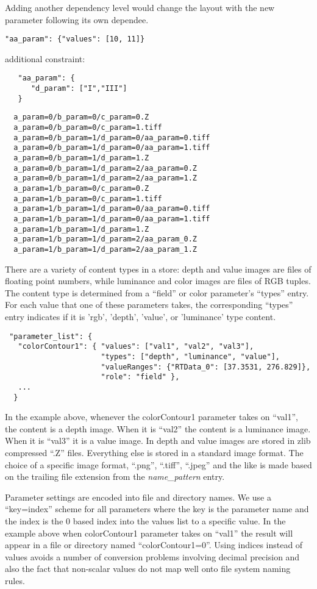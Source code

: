 Adding another dependency level would change the layout with the new parameter following its own dependee.
\begin{verbatim}
"aa_param": {"values": [10, 11]}
\end{verbatim}
additional constraint:
\begin{verbatim}
   "aa_param": {
      "d_param": ["I","III"]
   }
\end{verbatim}
\begin{verbatim}
  a_param=0/b_param=0/c_param=0.Z
  a_param=0/b_param=0/c_param=1.tiff
  a_param=0/b_param=1/d_param=0/aa_param=0.tiff
  a_param=0/b_param=1/d_param=0/aa_param=1.tiff
  a_param=0/b_param=1/d_param=1.Z
  a_param=0/b_param=1/d_param=2/aa_param=0.Z
  a_param=0/b_param=1/d_param=2/aa_param=1.Z
  a_param=1/b_param=0/c_param=0.Z
  a_param=1/b_param=0/c_param=1.tiff
  a_param=1/b_param=1/d_param=0/aa_param=0.tiff
  a_param=1/b_param=1/d_param=0/aa_param=1.tiff
  a_param=1/b_param=1/d_param=1.Z
  a_param=1/b_param=1/d_param=2/aa_param_0.Z
  a_param=1/b_param=1/d_param=2/aa_param_1.Z
\end{verbatim}


There are a variety of content types in a \chaplin store: depth and value images are files of floating point numbers, while luminance and color images are files of RGB tuples. The content type is determined from a ``field'' or color parameter's  ``types'' entry. For each value that one of these parameters takes, the corresponding ``types'' entry indicates if it is 'rgb', 'depth', 'value', or 'luminance' type content.

\begin{verbatim}
 "parameter_list": {
   "colorContour1": { "values": ["val1", "val2", "val3"],
                      "types": ["depth", "luminance", "value"],
                      "valueRanges": {"RTData_0": [37.3531, 276.829]},
                      "role": "field" },
   ...
  }
\end{verbatim}

In the example above, whenever the colorContour1 parameter takes on ``val1'', the content is a depth image. When it is ``val2'' the content is a luminance image. When it is ``val3'' it is a value image. In \chaplin depth and value images are stored in zlib compressed ``.Z'' files. Everything else is stored in a standard image format. The choice of a specific image format, ``.png'', ``.tiff'', ``.jpeg'' and the like is made based on the trailing file extension from the \textit{name\_pattern} entry.


Parameter settings are encoded into file and directory names. We use a ``key=index'' scheme for all parameters where the key is the parameter name and the index is the 0 based index into the values list to a specific value. In the example above when colorContour1 parameter takes on ``val1'' the result will appear in a file or directory named ``colorContour1=0''. Using indices instead of values avoids a number of conversion problems involving decimal precision and also the fact that non-scalar values do not map well onto file system naming rules.
